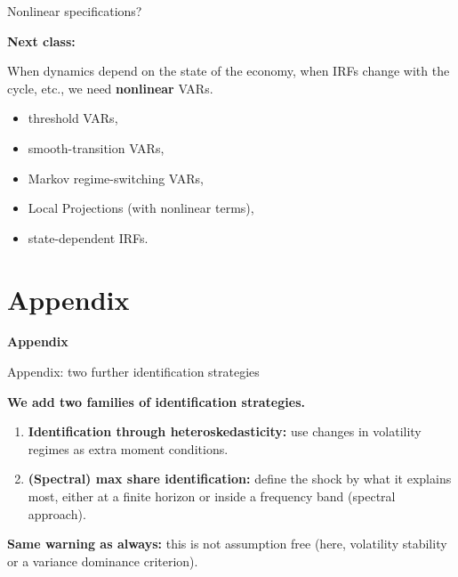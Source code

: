 \documentclass{beamer}
\begin{document}
\begin{frame}{Nonlinear specifications?}

\textbf{Next class:}  

\medskip

When dynamics depend on the state of the economy, when IRFs change with the cycle, etc., we need \textbf{nonlinear} VARs.

\begin{itemize}
  \item threshold VARs,
  \item smooth-transition VARs,
  \item   Markov regime-switching VARs,
  \item Local Projections (with nonlinear terms),
  \item state-dependent IRFs.
\end{itemize}

\end{frame}







\appendix
\section{Appendix}



\begin{frame}{}

\Large

\centering 
\textbf{Appendix}

\end{frame}



\begin{frame}{Appendix: two further identification strategies}
\small

\textbf{We add two families of identification strategies.}


\begin{enumerate}\itemsep5pt
  \item \textbf{Identification through heteroskedasticity:} use changes in volatility regimes as extra moment conditions.
  \item \textbf{(Spectral) max share identification:} define the shock by what it explains most, either at a finite horizon or inside a frequency band (spectral approach).
\end{enumerate}

\medskip

\textbf{Same warning as always:} this is not assumption free (here, volatility stability or a variance dominance criterion).

\end{frame}
\end{document}
